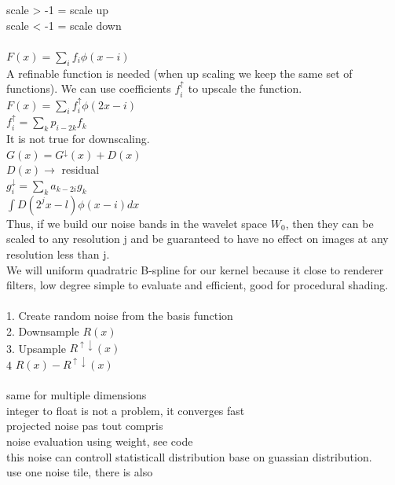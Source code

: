\documentclass[11pt,a4paper]{article}
\begin{document}
scale > -1 = scale up\\
scale < -1 = scale down\\\\
$F(x) = \sum\limits_{i}f_i \phi(x-i)$\\
A refinable function is needed (when up scaling we keep the same set of functions).
We can use coefficients $f_i^\uparrow$ to upscale the function.\\
$F(x) = \sum\limits_{i}f_i^\uparrow \phi(2x-i)$\\
$f_i^\uparrow =\sum\limits_{k}p_{i-2k}f_k $\\
It is not true for downscaling.\\
$G(x) = G^{\downarrow}(x) + D(x)$\\
$D(x)\longrightarrow$ residual \\
$g_i^\downarrow=\sum\limits_{k}a_{k-2i}g_k $\\
$\int D(2^jx-l)\phi(x-i)dx$\\
Thus, if we build our noise bands in the wavelet space $W_0$, then they can be
scaled to any resolution j and be guaranteed to have no effect on
images at any resolution less than j.
\\
We will uniform quadratric B-spline for our kernel because it close to renderer filters, low degree simple to evaluate and efficient, good for procedural shading.\\\\
1. Create random noise from the basis function\\
2. Downsample $R(x)$\\
3. Upsample $R^{\uparrow\downarrow}(x)$\\
4  $R(x) - R^{\uparrow\downarrow}(x)$\\\\
same for multiple dimensions\\
integer to float is not a problem, it converges fast\\
projected noise pas tout compris\\
noise evaluation using weight, see code\\
this noise can controll statisticall distribution base on guassian distribution.\\
use one noise tile, there is also \\
\end{document}
